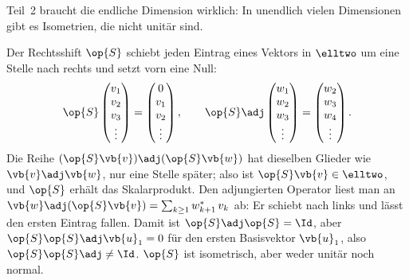 Teil~2 braucht die endliche Dimension wirklich: In unendlich vielen Dimensionen gibt es
Isometrien, die nicht unitär sind.

\begin{vertiefung}[id=c03.v6,
    titel={Isometrisch, aber nicht unitär},
    wozu={In endlicher Dimension ist jede Isometrie unitär
      (Proposition~\ref{c03.prop.isometrie}). Hier ist eine Isometrie von $\elltwo$, die es nicht
      ist, und man sieht, an welchem Schritt des Beweises es liegt.},
    voraussetzung={Proposition~\ref{c03.prop.isometrie}; Vertiefungen~\ref{c03.v1} und~\ref{c03.v4}
      (Beispiel einer Basis von $\elltwo$). Der Kern bis Kapitel~4 braucht den Block nicht.},
    zurueck={In unendlich vielen Dimensionen kann ein Operator das Skalarprodukt erhalten, ohne
      unitär zu sein. Teil~2 von Proposition~\ref{c03.prop.isometrie} gilt nur in endlicher
      Dimension.}]
  \begin{example}\label{c03.ex.shift}
    Der Rechtsshift $\op{S}$ schiebt jeden Eintrag eines Vektors in $\elltwo$ um eine Stelle
    nach rechts und setzt vorn eine Null:
    \begin{equation}\label{c03.eq.shift}
      \op{S} \begin{pmatrix} v_1 \\ v_2 \\ v_3 \\ \vdots \end{pmatrix}
      = \begin{pmatrix} 0 \\ v_1 \\ v_2 \\ \vdots \end{pmatrix} ,
      \qquad
      \op{S}\adj \begin{pmatrix} w_1 \\ w_2 \\ w_3 \\ \vdots \end{pmatrix}
      = \begin{pmatrix} w_2 \\ w_3 \\ w_4 \\ \vdots \end{pmatrix} .
    \end{equation}
    Die Reihe $(\op{S}\vb{v})\adj(\op{S}\vb{w})$ hat dieselben Glieder wie $\vb{v}\adj\vb{w}$,
    nur eine Stelle später; also ist $\op{S}\vb{v} \in \elltwo$, und $\op{S}$ erhält das
    Skalarprodukt. Den adjungierten Operator liest man an
    $\vb{w}\adj(\op{S}\vb{v}) = \sum_{k \geq 1} w_{k+1}^*\, v_k$ ab: Er schiebt nach links und
    lässt den ersten Eintrag fallen. Damit ist $\op{S}\adj\op{S} = \Id$, aber
    $\op{S}\op{S}\adj \vb{u}_1 = 0$ für den ersten Basisvektor $\vb{u}_1$, also
    $\op{S}\op{S}\adj \neq \Id$. $\op{S}$ ist isometrisch, aber weder unitär noch normal.
  \end{example}


\end{vertiefung}
